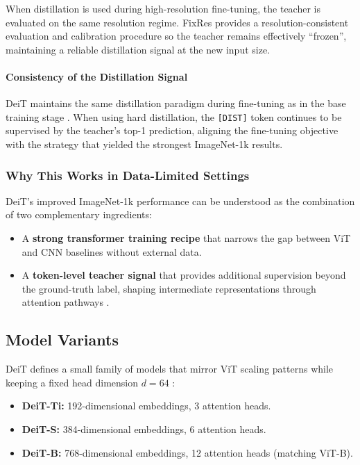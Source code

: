 \noindent
When distillation is used during high-resolution fine-tuning, the teacher is evaluated on the same resolution regime. FixRes \cite{touvron2019_fixres} provides a resolution-consistent evaluation and calibration procedure so the teacher remains effectively ``frozen'', maintaining a reliable distillation signal at the new input size.

\paragraph{Consistency of the Distillation Signal}

\noindent
DeiT maintains the same distillation paradigm during fine-tuning as in the base training stage \cite{touvron2021_deit}. When using hard distillation, the \texttt{[DIST]} token continues to be supervised by the teacher's top-1 prediction, aligning the fine-tuning objective with the strategy that yielded the strongest ImageNet-1k results.

\subsubsection{Why This Works in Data-Limited Settings}
\label{subsubsec:chapter18_deit_why_works}

\noindent
DeiT's improved ImageNet-1k performance can be understood as the combination of two complementary ingredients:
\begin{itemize}
	\item A \textbf{strong transformer training recipe} that narrows the gap between ViT and CNN baselines without external data.
	\item A \textbf{token-level teacher signal} that provides additional supervision beyond the ground-truth label, shaping intermediate representations through attention pathways \cite{touvron2021_deit}.
\end{itemize}

\subsection{Model Variants}
\label{subsec:chapter18_deit_variants}

\noindent
DeiT defines a small family of models that mirror ViT scaling patterns while keeping a fixed head dimension \(d=64\) \cite{touvron2021_deit}:
\begin{itemize}
	\item \textbf{DeiT-Ti:} 192-dimensional embeddings, 3 attention heads.
	\item \textbf{DeiT-S:} 384-dimensional embeddings, 6 attention heads.
	\item \textbf{DeiT-B:} 768-dimensional embeddings, 12 attention heads (matching ViT-B).
\end{itemize}


